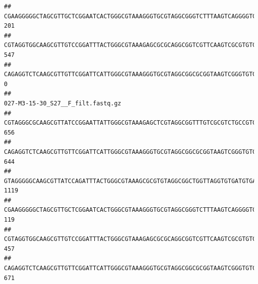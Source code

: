 \documentclass[]{article}
\begin{document}
\begin{verbatim}
## CGAAGGGGGCTAGCGTTGCTCGGAATCACTGGGCGTAAAGGGTGCGTAGGCGGGTCTTTAAGTCAGGGGTGAAATCCTGGAGCTCAACTCCAGAACTGCCTTTGATACTGAAGATCTTGAGTTCGGGAGAGGTGAGTGGAACTGCGAGTGTAGAGGTGAAATTCGTAGATATTCGCAAGAACACCAGTGGCGAAGGCGGCTCACTGGCCCGATACTGACGCTGAGGCACGAAAGCGTGGGGAGCAAACA                              201
## CGTAGGTGGCAAGCGTTGTCCGGATTTACTGGGCGTAAAGAGCGCGCAGGCGGTCGTTCAAGTCGCGTGTGAAAGCCCCCGGCTCAACTGGGGAGGGTCACGCGATACTGATCGACTCGAAGGCAGGAGAGGGTAGTGGAATTCCCGGTGTAGTGGTGAAATGCGTAGATATCGGGAGGAACACCAGTGGCGAAGGCGACTACCTGGCCTGTTCTTGACGCTGAGGCGCGAAAGCTAGGGGAGCAAACG                              547
## CAGAGGTCTCAAGCGTTGTTCGGATTCATTGGGCGTAAAGGGTGCGTAGGCGGCGCGGTAAGTCGGGTGTGAAATCTCGGGGCTTAACTCCGAAACTGCATTCGATACTGCCGTGCTTGAGGACTGGAGAGGAGACTGGAATTTACGGTGTAGCGGTGAAATGCGTAGATATCGTAAGGAAGACCAGTGGCGAAGGCGGGTCTCTGGACAGTTCCTGACGCTGAGGCACGAAGGCCAGGGGAGCAAACG                                0
##                                                                                                                                                                                                                                                           027-M3-15-30_S27__F_filt.fastq.gz
## CGTAGGGCGCAAGCGTTATCCGGAATTATTGGGCGTAAAGAGCTCGTAGGCGGTTTGTCGCGTCTGCCGTGAAAGTCCGGGGCTCAACTCCGGATCTGCGGTGGGTACGGGCAGACTAGAGTGATGTAGGGGAGACTGGAATTCCTGGTGTAGCGGTGAAATGCGCAGATATCAGGAGGAACACCGATGGCGAAGGCAGGTCTCTGGGCATTAACTGACGCTGAGGAGCGAAAGCATGGGGAGCGAACA                               656
## CAGAGGTCTCAAGCGTTGTTCGGATTCATTGGGCGTAAAGGGTGCGTAGGCGGCGCGGTAAGTCGGGTGTGAAATCTCGGAGCTTAACTCCGAAACTGCATTCGATACTGCCGTGCTTGAGGACTGGAGAGGAGACTGGAATTTACGGTGTAGCGGTGAAATGCGTAGATATCGTAAGGAAGACCAGTGGCGAAGGCGGGTCTCTGGACAGTTCCTGACGCTGAGGCACGAAGGCCAGGGGAGCAAACG                               644
## GTAGGGGGCAAGCGTTATCCAGATTTACTGGGCGTAAAGCGCGTGTAGGCGGCTGGTTAGGTGTGATGTGAAATCTTCCGGCTCAACCGGAAAACTGCATTGCAAACCGGCCTGGCTAGAGTGCAGGAGAGGGAAGCGGAATTCCAGGTGTAGCGGTGAAATGCGTAGATATCTGGAGGAACACCAGTGGCGAAGGCGGCTTCCTGGCCTGCAACTGACGCTGAGACGCGAAAGCGTGGGGAGCGAAC                               1119
## CGAAGGGGGCTAGCGTTGCTCGGAATCACTGGGCGTAAAGGGTGCGTAGGCGGGTCTTTAAGTCAGGGGTGAAATCCTGGAGCTCAACTCCAGAACTGCCTTTGATACTGAAGATCTTGAGTTCGGGAGAGGTGAGTGGAACTGCGAGTGTAGAGGTGAAATTCGTAGATATTCGCAAGAACACCAGTGGCGAAGGCGGCTCACTGGCCCGATACTGACGCTGAGGCACGAAAGCGTGGGGAGCAAACA                               119
## CGTAGGTGGCAAGCGTTGTCCGGATTTACTGGGCGTAAAGAGCGCGCAGGCGGTCGTTCAAGTCGCGTGTGAAAGCCCCCGGCTCAACTGGGGAGGGTCACGCGATACTGATCGACTCGAAGGCAGGAGAGGGTAGTGGAATTCCCGGTGTAGTGGTGAAATGCGTAGATATCGGGAGGAACACCAGTGGCGAAGGCGACTACCTGGCCTGTTCTTGACGCTGAGGCGCGAAAGCTAGGGGAGCAAACG                               457
## CAGAGGTCTCAAGCGTTGTTCGGATTCATTGGGCGTAAAGGGTGCGTAGGCGGCGCGGTAAGTCGGGTGTGAAATCTCGGGGCTTAACTCCGAAACTGCATTCGATACTGCCGTGCTTGAGGACTGGAGAGGAGACTGGAATTTACGGTGTAGCGGTGAAATGCGTAGATATCGTAAGGAAGACCAGTGGCGAAGGCGGGTCTCTGGACAGTTCCTGACGCTGAGGCACGAAGGCCAGGGGAGCAAACG                               671

\end{verbatim}
\end{document}

